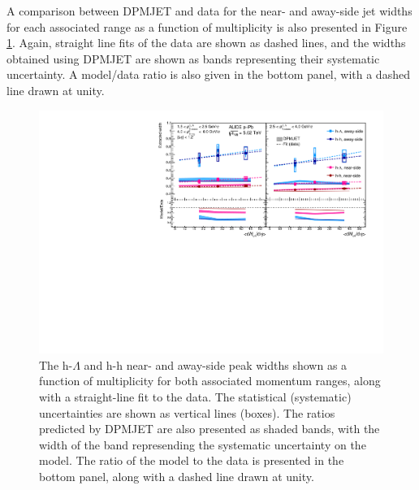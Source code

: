 A comparison between DPMJET and data for the near- and away-side jet widths for each associated \pt range as a function of multiplicity is also presented in Figure \ref{fig:jet_widths_model}. Again, straight line fits of the data are shown as dashed lines, and the widths obtained using DPMJET are shown as bands representing their systematic uncertainty. A model/data ratio is also given in the bottom panel, with a dashed line drawn at unity.


\begin{figure}[h!]
\centering
\includegraphics[width=\textwidth]{figures/results/final_width_plot_new_x_axis_model_ratio.pdf}
\caption{The h-$\Lambda$ and h-h near- and away-side peak widths shown as a function of multiplicity for both associated momentum ranges, along with a straight-line fit to the data. The statistical (systematic) uncertainties are shown as vertical lines (boxes). The ratios predicted by DPMJET are also presented as shaded bands, with the width of the band represending the systematic uncertainty on the model. The ratio of the model to the data is presented in the bottom panel, along with a dashed line drawn at unity.}
\label{fig:jet_widths_model}
\end{figure}

